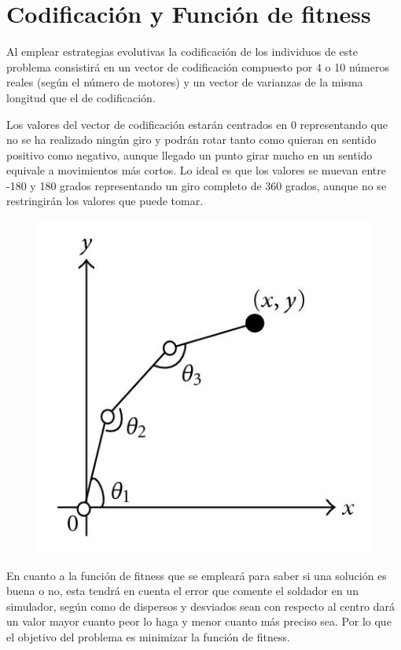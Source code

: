 \documentclass[12pt, spanish, pdftex]{UC3M_document}
\begin{document}
\section{Codificación y Función de fitness}
Al emplear estrategias evolutivas la codificación de los individuos de este problema consistirá en un vector de codificación compuesto por 4 o 10 números reales (según el número de motores) y un vector de varianzas de la misma longitud que el de codificación.

Los valores del vector de codificación estarán centrados en 0 representando que no se ha realizado ningún giro y podrán rotar tanto como quieran en sentido positivo como negativo, aunque llegado un punto girar mucho en un sentido equivale a movimientos más cortos. Lo ideal es que los valores se muevan entre -180 y 180 grados representando un giro completo de 360 grados, aunque no se restringirán los valores que puede tomar.
\begin{figure}[H]
	{\includegraphics[scale=1.5]{./img/arm_angles.jpg}}
\end{figure}

En cuanto a la función de fitness que se empleará para saber si una solución es buena o no, esta tendrá en cuenta el error que comente el soldador en un simulador, según como de dispersos y desviados sean con respecto al centro dará un valor mayor cuanto peor lo haga y menor cuanto más preciso sea. Por lo que el objetivo del problema es minimizar la función de fitness.
\end{document}
